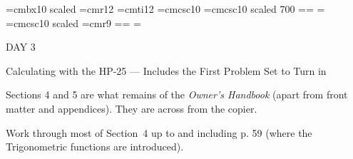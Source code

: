 
\def\folio{\ifnum\pageno>0 \number\pageno \else
   \ifnum\pageno<0 \romannumeral-\pageno \else\fi\fi}

\font\largebf=cmbx10  scaled 
\font\largerm=cmr12
\font\largeit=cmti12
\font\tensc=cmcsc10
\font\sevensc=cmcsc10 scaled 700
\newfam\scfam \def\sc{\fam\scfam\tensc}
\textfont\scfam=\tensc \scriptfont\scfam=\sevensc
\scriptscriptfont\scfam=\sevensc
\font\largesc=cmcsc10 scaled 
\font\ninerm=cmr9
\newfam\srfam \def\sr{\fam\srfam\ninerm}
\textfont\srfam=\ninerm \scriptfont\srfam=\sevenrm
\scriptscriptfont\srfam=\fiverm




\null\vskip36pt

\centerline{\largerm DAY 3}
\nobreak\bigskip

\centerline{\largeit Calculating with the HP-25 --- Includes the First Problem Set to Turn in}
\nobreak\bigskip

\nobreak\bigskip

Sections 4 and 5 are what remains of the {\it Owner's Handbook} (apart from front matter and appendices). They are across from the copier.

Work through most of Section~4 up to and including p. 59 (where the Trigonometric functions are introduced).



\nobreak\bigskip


\noindent 
\bye
